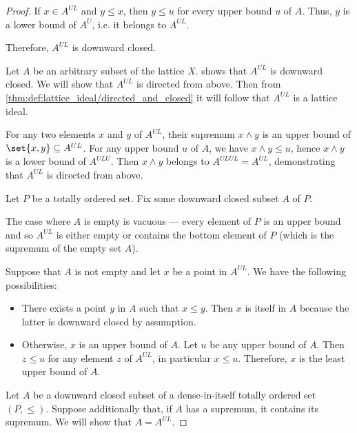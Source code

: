 \begin{proof}
   If \( x \in A^{UL} \) and \( y \leq x \), then \( y \leq u \) for every upper bound \( u \) of \( A \). Thus, \( y \) is a lower bound of \( A^U \), i.e. it belongs to \( A^{UL} \).

  Therefore, \( A^{UL} \) is downward closed.

   Let \( A \) be an arbitrary subset of the lattice \( X \).  shows that \( A^{UL} \) is downward closed. We will show that \( A^{UL} \) is directed from above. Then from \cref{thm:def:lattice_ideal/directed_and_closed} it will follow that \( A^{UL} \) is a lattice ideal.

  For any two elements \( x \) and \( y \) of \( A^{UL} \), their supremum \( x \wedge y \) is an upper bound of \( \set{ x, y } \subseteq A^{UL} \). For any upper bound \( u \) of \( A \), we have \( x \wedge y \leq u \), hence \( x \wedge y \) is a lower bound of \( A^{ULU} \). Then \( x \wedge y \) belongs to \( A^{ULUL} = A^{UL} \), demonstrating that \( A^{UL} \) is directed from above.

   Let \( P \) be a totally ordered set. Fix some downward closed subset \( A \) of \( P \).

  The case where \( A \) is empty is vacuous --- every element of \( P \) is an upper bound and so \( A^{UL} \) is either empty or contains the bottom element of \( P \) (which is the supremum of the empty set \( A \)).

  Suppose that \( A \) is not empty and let \( x \) be a point in \( A^{UL} \). We have the following possibilities:
  \begin{itemize}
    \item There exists a point \( y \) in \( A \) such that \( x \leq y \). Then \( x \) is itself in \( A \) because the latter is downward closed by assumption.
    \item Otherwise, \( x \) is an upper bound of \( A \). Let \( u \) be any upper bound of \( A \). Then \( z \leq u \) for any element \( z \) of \( A^{UL} \), in particular \( x \leq u \). Therefore, \( x \) is the least upper bound of \( A \).
  \end{itemize}

   Let \( A \) be a downward closed subset of a dense-in-itself totally ordered set \( (P, \leq) \). Suppose additionally that, if \( A \) has a supremum, it contains its supremum. We will show that \( A = A^{UL} \).


\end{proof}
